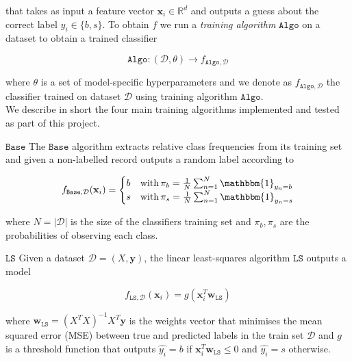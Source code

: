 \documentclass[10pt,conference,compsocconf]{IEEEtran}
\newcommand{\parabf}[1]{\vspace{1mm}\noindent\textbf{#1}}
\newcommand{\Data}{\mathcal{D}}
\newcommand{\features}{\mathbf{x}_i}
\newcommand{\target}{y_i}
\newcommand{\targetset}{\{ b, s \}}
\newcommand{\targetvector}{\mathbf{y}}
\newcommand{\weights}{\mathbf{w}}
\newcommand{\classifier}[2]{f_{#1, #2}}
\newcommand{\Train}{\mathtt{Algo}}
\newcommand{\LeastSquares}{\mathtt{LS}}
\newcommand{\Baseline}{\mathtt{Base}}
\begin{document}
that takes as input a feature vector $\features \in \mathbb{R}^d$ and outputs a guess about the correct label $\target \in \targetset$. To obtain $f$ we run a \emph{training algorithm} $\Train$ on a dataset to obtain a trained classifier

\vspace*{-4mm}
\begin{equation}
	\Train: (\Data, \theta) \rightarrow \classifier{\Train}{\Data}
\end{equation}

where $\theta$ is a set of model-specific hyperparameters and we denote as $\classifier{\Train}{\Data}$ the classifier trained on dataset $\Data$ using training algorithm $\Train$.\\

We describe in short the four main training algorithms implemented and tested as part of this project.

\parabf{$\Baseline$} The $\Baseline$ algorithm extracts relative class frequencies from its training set and given a non-labelled record outputs a random label according to

\vspace*{-3mm}
\begin{equation}
	\classifier{\Baseline}{\Data}(\features) = 
	\begin{cases}
	b &\mbox{with}\,  \pi_b = \frac{1}{N} \sum_{n=1}^N{\mathbbm{1}_{y_n = b}}\\
	s &\mbox{with}\,  \pi_s = \frac{1}{N} \sum_{n=1}^N{\mathbbm{1}_{y_n = s}}
	\end{cases}
\end{equation}

where $N = |\Data|$ is the size of the classifiers training set and $\pi_b, \pi_s$ are the probabilities of observing each class. 

\parabf{$\LeastSquares$} Given a dataset $\Data = (X, \targetvector)$, the linear least-squares algorithm $\LeastSquares$ outputs a model

\vspace*{-4mm}
\begin{equation}
	\classifier{\LeastSquares}{\Data}(\features) = g(\features^T \weights_{\LeastSquares})
\end{equation}

where $\weights_{\LeastSquares} = (X^T X)^{-1}X^T \targetvector$ is the weights vector that minimises the mean squared error (MSE) between true and predicted labels in the train set $\Data$ and $g$ is a threshold function that outputs $\hat{\target} = b$ if $\features^T \weights_{\LeastSquares} \leq 0$ and $\hat{\target} = s$ otherwise.
\end{document}
